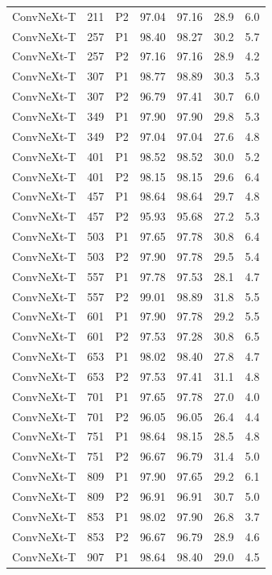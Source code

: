 {\begin{longtable}{lrlrrrr}
ConvNeXt-T & 211 & P2 & 97.04 & 97.16 & 28.9 & 6.0 \\
ConvNeXt-T & 257 & P1 & 98.40 & 98.27 & 30.2 & 5.7 \\
ConvNeXt-T & 257 & P2 & 97.16 & 97.16 & 28.9 & 4.2 \\
ConvNeXt-T & 307 & P1 & 98.77 & 98.89 & 30.3 & 5.3 \\
ConvNeXt-T & 307 & P2 & 96.79 & 97.41 & 30.7 & 6.0 \\
ConvNeXt-T & 349 & P1 & 97.90 & 97.90 & 29.8 & 5.3 \\
ConvNeXt-T & 349 & P2 & 97.04 & 97.04 & 27.6 & 4.8 \\
ConvNeXt-T & 401 & P1 & 98.52 & 98.52 & 30.0 & 5.2 \\
ConvNeXt-T & 401 & P2 & 98.15 & 98.15 & 29.6 & 6.4 \\
ConvNeXt-T & 457 & P1 & 98.64 & 98.64 & 29.7 & 4.8 \\
ConvNeXt-T & 457 & P2 & 95.93 & 95.68 & 27.2 & 5.3 \\
ConvNeXt-T & 503 & P1 & 97.65 & 97.78 & 30.8 & 6.4 \\
ConvNeXt-T & 503 & P2 & 97.90 & 97.78 & 29.5 & 5.4 \\
ConvNeXt-T & 557 & P1 & 97.78 & 97.53 & 28.1 & 4.7 \\
ConvNeXt-T & 557 & P2 & 99.01 & 98.89 & 31.8 & 5.5 \\
ConvNeXt-T & 601 & P1 & 97.90 & 97.78 & 29.2 & 5.5 \\
ConvNeXt-T & 601 & P2 & 97.53 & 97.28 & 30.8 & 6.5 \\
ConvNeXt-T & 653 & P1 & 98.02 & 98.40 & 27.8 & 4.7 \\
ConvNeXt-T & 653 & P2 & 97.53 & 97.41 & 31.1 & 4.8 \\
ConvNeXt-T & 701 & P1 & 97.65 & 97.78 & 27.0 & 4.0 \\
ConvNeXt-T & 701 & P2 & 96.05 & 96.05 & 26.4 & 4.4 \\
ConvNeXt-T & 751 & P1 & 98.64 & 98.15 & 28.5 & 4.8 \\
ConvNeXt-T & 751 & P2 & 96.67 & 96.79 & 31.4 & 5.0 \\
ConvNeXt-T & 809 & P1 & 97.90 & 97.65 & 29.2 & 6.1 \\
ConvNeXt-T & 809 & P2 & 96.91 & 96.91 & 30.7 & 5.0 \\
ConvNeXt-T & 853 & P1 & 98.02 & 97.90 & 26.8 & 3.7 \\
ConvNeXt-T & 853 & P2 & 96.67 & 96.79 & 28.9 & 4.6 \\
ConvNeXt-T & 907 & P1 & 98.64 & 98.40 & 29.0 & 4.5 \\

\end{longtable}}
